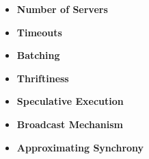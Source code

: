 \begin{itemize}
  \item \textbf{Number of Servers}
  \item \textbf{Timeouts}
  \item \textbf{Batching}
  \item \textbf{Thriftiness}
  \item \textbf{Speculative Execution}
  \item \textbf{Broadcast Mechanism}
  \item \textbf{Approximating Synchrony}
\end{itemize}
